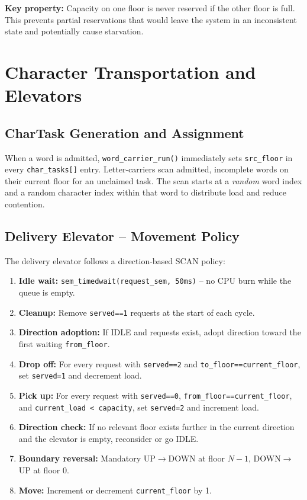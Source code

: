 \documentclass[12pt,a4paper]{article}
\newcommand{\code}[1]{\texttt{\small #1}}
\begin{document}
\begin{infobox}
\textbf{Key property:} Capacity on one floor is never reserved if the other floor
is full. This prevents partial reservations that would leave the system in an
inconsistent state and potentially cause starvation.
\end{infobox}

\section{Character Transportation and Elevators}

\subsection{CharTask Generation and Assignment}

When a word is admitted, \code{word\_carrier\_run()} immediately sets
\code{src\_floor} in every \code{char\_tasks[]} entry. Letter-carriers scan
admitted, incomplete words on their current floor for an unclaimed task. The scan
starts at a \emph{random} word index and a random character index within that word
to distribute load and reduce contention.

\subsection{Delivery Elevator -- Movement Policy}

The delivery elevator follows a direction-based SCAN policy:

\begin{enumerate}
  \item \textbf{Idle wait:} \code{sem\_timedwait(request\_sem, 50ms)} -- no CPU
        burn while the queue is empty.
  \item \textbf{Cleanup:} Remove \code{served==1} requests at the start of each cycle.
  \item \textbf{Direction adoption:} If IDLE and requests exist, adopt direction
        toward the first waiting \code{from\_floor}.
  \item \textbf{Drop off:} For every request with \code{served==2} and
        \code{to\_floor==current\_floor}, set \code{served=1} and decrement load.
  \item \textbf{Pick up:} For every request with \code{served==0},
        \code{from\_floor==current\_floor}, and \code{current\_load < capacity},
        set \code{served=2} and increment load.
  \item \textbf{Direction check:} If no relevant floor exists further in the
        current direction and the elevator is empty, reconsider or go IDLE.
  \item \textbf{Boundary reversal:} Mandatory UP$\to$DOWN at floor $N-1$,
        DOWN$\to$UP at floor 0.
  \item \textbf{Move:} Increment or decrement \code{current\_floor} by 1.
\end{enumerate}
\end{document}
